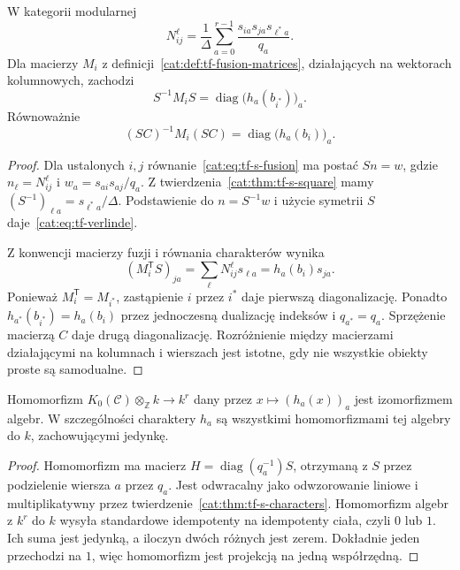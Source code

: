 \begin{twierdzenie}\label{cat:thm:tf-verlinde}
W kategorii modularnej
\begin{equation}\label{cat:eq:tf-verlinde}
 N_{ij}^{\ell}=\frac{1}{\Delta}
 \sum_{a=0}^{r-1}\frac{s_{ia}s_{ja}s_{\ell^*a}}{q_a}.
\end{equation}
Dla macierzy $M_i$ z definicji~\ref{cat:def:tf-fusion-matrices}, działających na wektorach kolumnowych, zachodzi
\[
 S^{-1}M_iS=\operatorname{diag}\bigl(h_a(b_{i^*})\bigr)_a.
\]
Równoważnie
\[
 (SC)^{-1}M_i(SC)=\operatorname{diag}\bigl(h_a(b_i)\bigr)_a.
\]
\end{twierdzenie}
\begin{proof}
Dla ustalonych $i,j$ równanie~\eqref{cat:eq:tf-s-fusion} ma postać $Sn=w$, gdzie $n_\ell=N_{ij}^{\ell}$ i $w_a=s_{ai}s_{aj}/q_a$. Z twierdzenia~\ref{cat:thm:tf-s-square} mamy $(S^{-1})_{\ell a}=s_{\ell^*a}/\Delta$. Podstawienie do $n=S^{-1}w$ i użycie symetrii $S$ daje~\eqref{cat:eq:tf-verlinde}.

Z konwencji macierzy fuzji i równania charakterów wynika
\[
 (M_i^{\mathsf T}S)_{ja}
 =\sum_\ell N_{ij}^{\ell}s_{\ell a}
 =h_a(b_i)s_{ja}.
\]
Ponieważ $M_i^{\mathsf T}=M_{i^*}$, zastąpienie $i$ przez $i^*$ daje pierwszą diagonalizację. Ponadto $h_{a^*}(b_{i^*})=h_a(b_i)$ przez jednoczesną dualizację indeksów i $q_{a^*}=q_a$. Sprzężenie macierzą $C$ daje drugą diagonalizację. Rozróżnienie między macierzami działającymi na kolumnach i wierszach jest istotne, gdy nie wszystkie obiekty proste są samodualne.
\end{proof}

\begin{wniosek}\label{cat:cor:tf-fusion-algebra-split}
Homomorfizm $K_0(\mathcal C)\otimes_{\mathbb Z} k\to k^r$ dany przez $x\mapsto(h_a(x))_a$ jest izomorfizmem algebr. W szczególności charaktery $h_a$ są wszystkimi homomorfizmami tej algebry do $k$, zachowującymi jedynkę.
\end{wniosek}
\begin{proof}
Homomorfizm ma macierz $H=\operatorname{diag}(q_a^{-1})S$, otrzymaną z $S$ przez podzielenie wiersza $a$ przez $q_a$. Jest odwracalny jako odwzorowanie liniowe i multiplikatywny przez twierdzenie~\ref{cat:thm:tf-s-characters}. Homomorfizm algebr z $k^r$ do $k$ wysyła standardowe idempotenty na idempotenty ciała, czyli $0$ lub $1$. Ich suma jest jedynką, a iloczyn dwóch różnych jest zerem. Dokładnie jeden przechodzi na $1$, więc homomorfizm jest projekcją na jedną współrzędną.
\end{proof}

